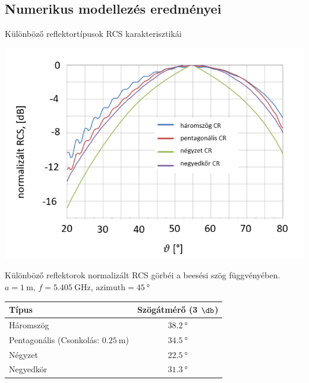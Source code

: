 \documentclass[aspectratio=169]{beamer}
\begin{document}
\subsection{Numerikus modellezés eredményei}


\begin{frame}{Különböző reflektortípusok RCS karakterisztikái}
    \begin{minipage}[c]{0.55\textwidth}
        \centering
        \includegraphics[width=\textwidth]{reflectors_compare_elevation.png}
        
        Különböző reflektorok normalizált RCS görbéi a beesési szög függvényében. $a = \SI{1}{\meter} $, $f = \SI{5.405}{\giga\hertz}$, $\text{azimuth} = \SI{45}{\degree}$
    \end{minipage}
    \hspace{5pt}
    \begin{minipage}[c]{0.325\textwidth}
        \begin{table}
            \centering
            \begin{tabular}{m{75pt} c} \toprule
                Típus & Szögátmérő (3 $\db$) \\ \midrule
                Háromszög & $\SI{38.2}{\degree}$ \\ \hline
                Pentagonális (Csonkolás: $\SI{0.25}{\meter}$)& $\SI{34.5}{\degree}$ \\ \hline
                Négyzet & $\SI{22.5}{\degree}$ \\ \hline
                Negyedkör & $\SI{31.3}{\degree}$ 
            \end{tabular}
        \end{table}
    \end{minipage}
\end{frame}
\end{document}
